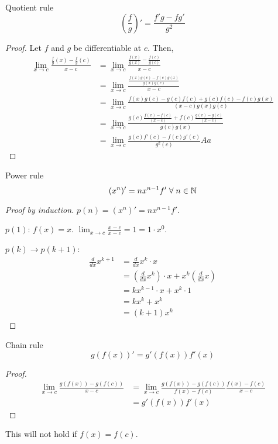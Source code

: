 \begin{theorem}{Quotient rule}{}
    $$(\frac{f}{g})' = \frac{f'g - fg'}{g^2}$$
\end{theorem}
\begin{proof}
    Let $f$ and $g$ be differentiable at $c$. Then,
    \begin{align*}
        \lim_{x \to c} \frac{\frac{f}{g}(x) - \frac{f}{g}(c)}{x - c} &= \lim_{x \to c} \frac{\frac{f(x)}{g(x)} - \frac{f(c)}{g(c)}}{x - c} \\
        &= \lim_{x \to c} \frac{\frac{f(x)g(c) - f(c)g(x)}{g(x)g(c)}}{x - c} \\
        &= \lim_{x \to c} \frac{f(x)g(c) - g(c)f(c) + g(c)f(c) - f(c)g(x)}{(x - c) g(x)g(c)} \\
        &= \lim_{x \to c} \frac{g(c) \frac{f(x) - f(c)}{(x - c)} + f(c) \frac{g(x) - g(c)}{(x - c)}}{g(c)g(x)} \\
        &= \lim_{x \to c} \frac{g(c)f'(c) - f(c)g'(c)}{g^2(c)}Aa
    \end{align*}
\end{proof}

\begin{theorem}{Power rule}{}
    $$(x^n)' = nx^{n - 1}f' \;\forall\; n \in \mathbb{N}$$
\end{theorem}
\begin{proof}[Proof by induction]
    $p(n) = (x^n)' = nx^{n - 1}f'$.

    $p(1)$: $f(x) = x$. $\lim_{x \to c} \frac{x - c}{x - c} = 1 = 1 \cdot x^0$.

    $p(k) \rightarrow p(k + 1)$:
    \begin{align*}
        \frac{d}{dx} x^{k + 1} &= \frac{d}{dx} x^k \cdot x \\
        &= (\frac{d}{dx} x^k) \cdot x + x^k (\frac{d}{dx} x) \\
        &= kx^{k - 1} \cdot x + x^k \cdot 1 \\
        &= kx^k + x^k \\
        &= (k + 1)x^k
    \end{align*}
\end{proof}

\begin{theorem}{Chain rule}{}
    $$g(f(x))' = g'(f(x))f'(x)$$
\end{theorem}
\begin{proof}
    \begin{align*}
        \lim_{x \to c} \frac{g(f(x)) - g(f(c))}{x - c} &= \lim_{x \to c} \frac{g(f(x)) - g(f(c))}{f(x) - f(c)} \frac{f(x) - f(c)}{x - c} \\
        &= g'(f(x)) f'(x)
    \end{align*}
\end{proof}
\begin{note}
    This will not hold if $f(x) = f(c)$.
\end{note}

